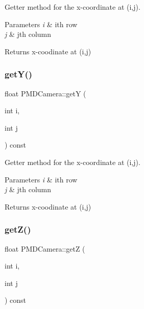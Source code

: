Getter method for the x-\/coordinate at (i,j). 


\begin{DoxyParams}{Parameters}
{\em i} & ith row \\
\hline
{\em j} & jth column \\
\hline
\end{DoxyParams}
\begin{DoxyReturn}{Returns}
x-\/coodinate at (i,j) 
\end{DoxyReturn}
\hypertarget{class_p_m_d_camera_a71344967a964b6c45fc7dfd8b5f56e63}{}\label{class_p_m_d_camera_a71344967a964b6c45fc7dfd8b5f56e63} 
\subsubsection{\texorpdfstring{get\+Y()}{getY()}}
{\footnotesize\ttfamily float P\+M\+D\+Camera\+::getY (\begin{DoxyParamCaption}\item[{int}]{i,  }\item[{int}]{j }\end{DoxyParamCaption}) const\hspace{0.3cm}{\ttfamily [private]}}



Getter method for the x-\/coordinate at (i,j). 


\begin{DoxyParams}{Parameters}
{\em i} & ith row \\
\hline
{\em j} & jth column \\
\hline
\end{DoxyParams}
\begin{DoxyReturn}{Returns}
x-\/coodinate at (i,j) 
\end{DoxyReturn}
\hypertarget{class_p_m_d_camera_a98254399959993d8a181f17402845457}{}\label{class_p_m_d_camera_a98254399959993d8a181f17402845457} 
\subsubsection{\texorpdfstring{get\+Z()}{getZ()}}
{\footnotesize\ttfamily float P\+M\+D\+Camera\+::getZ (\begin{DoxyParamCaption}\item[{int}]{i,  }\item[{int}]{j }\end{DoxyParamCaption}) const\hspace{0.3cm}{\ttfamily [private]}}



